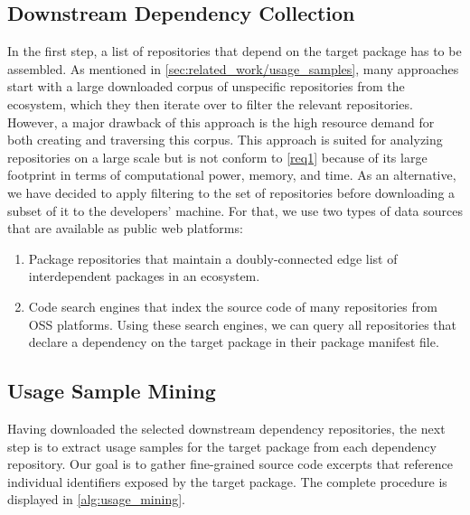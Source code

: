 \documentclass[a4paper,twoside]{article}
\begin{document}
\subsection{Downstream Dependency Collection}
\label{sec:approach/dependency_collection}

In the first step, a list of repositories that depend on the target package has to be assembled.
As mentioned in \cref{sec:related_work/usage_samples}, many approaches start with a large downloaded corpus of unspecific repositories from the ecosystem, which they then iterate over to filter the relevant repositories.
However, a major drawback of this approach is the high resource demand for both creating and traversing this corpus.
This approach is suited for analyzing repositories on a large scale but is not conform to \cref{req1} because of its large footprint in terms of computational power, memory, and time.
As an alternative, we have decided to apply filtering to the set of repositories before downloading a subset of it to the developers' machine.
For that, we use two types of data sources that are available as public web platforms:

\begin{enumerate}[label=(\roman*)]
	\item Package repositories that maintain a doubly-connected edge list of interdependent packages in an ecosystem.
	\item Code search engines that index the source code of many repositories from OSS platforms. Using these search engines, we can query all repositories that declare a dependency on the target package in their package manifest file.
\end{enumerate}

\subsection{Usage Sample Mining}
\label{sec:approach/usage_mining}

Having downloaded the selected downstream dependency repositories, the next step is to extract usage samples for the target package from each dependency repository.
Our goal is to gather fine-grained source code excerpts that reference individual identifiers exposed by the target package.
The complete procedure is displayed in \cref{alg:usage_mining}.
\end{document}
